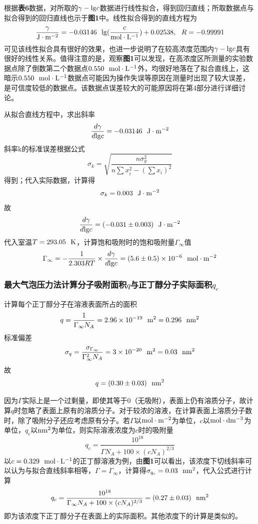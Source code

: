 \documentclass[12pt]{article}
\begin{document}
\par 
根据\textbf{表6}数据，对所取的$\gamma-{\rm lg}c$数据进行线性拟合，得到回归直线；所取数据点与拟合得到的回归直线也示于\textbf{图1}中。线性拟合得到的直线方程为
$$
\frac{\gamma}{{\rm J\cdot m^{-2}}}=-0.03146\ \ {\rm lg}(\frac{c}{{\rm mol\cdot L^{-1}}})+0.02538,\ \ R=-0.99991
$$
可见该线性拟合具有很好的效果，也进一步说明了在较高浓度范围内$\gamma-{\rm lg}c$具有很好的线性关系。值得注意的是，观察\textbf{图1}可以发现，在高浓度区所测量的实验数据点除了倒数第二个数据点$0.550\ \ {\rm mol\cdot L^{-1}}$外，均很好地落在了拟合直线上，这暗示$0.550\ \ {\rm mol\cdot L^{-1}}$数据点可能因为操作失误等原因在测量时出现了较大误差，是可信度较低的数据点。该数据点误差较大的可能原因将在第4部分进行详细讨论。\par 
从拟合直线方程中，求出斜率
$$
\frac{d\gamma}{d{\rm lg}c}=-0.03146\ \ {\rm J\cdot m^{-2}}
$$
斜率k的标准误差根据公式
$$
\sigma_{k}=\sqrt{\frac{n\sigma^{2}_{y}}{n\sum x^{2}_{i}-(\sum x_{i})^{2}}}
$$
得到；代入实际数据，计算得
$$
\sigma_{k}=0.003\ \ {\rm J\cdot m^{-2} }
$$
故
$$
\frac{d\gamma}{d{\rm lg}c}=(-0.031\pm0.003) \ \ {\rm J\cdot m^{-2}}
$$
代入室温$T=293.05\ \ {\rm K}$，计算饱和吸附时的饱和吸附量$\Gamma_{\infty}$值
$$
\Gamma_{\infty}=-\frac{1}{2.303RT}\times\frac{d\gamma}{d{\rm lg}c}=(5.6\pm 0.5)\times10^{-6}\ \ {\rm mol\cdot m^{-2}}
$$
\subsubsection{最大气泡压力法计算分子吸附面积$q$与正丁醇分子实际面积$q_{c}$}
计算每个正丁醇分子在溶液表面所占的面积
$$
q=\frac{1}{\Gamma_{\infty}N_{A}}=2.96\times10^{-19}\ \ {\rm m^2}=0.296\ \ {\rm nm^{2}}
$$
标准偏差
$$
\sigma_{q}=\frac{\sigma_{\Gamma_{\infty}}}{\Gamma^{2}_{\infty} N_{A}}=3\times10^{-20}\ \ {\rm m^{2}}=0.03\ \ {\rm nm^{2}}
$$
故
$$
q=(0.30\pm 0.03)\ \ {\rm nm^{2}}
$$
\par 
因为$\Gamma$实际上是一个过剩量，即使其等于0（无吸附），表面上仍有溶质分子，故计算$q$时忽略了表面上原有的溶质分子。对于较浓的溶液，在计算表面上溶质分子数时，除了吸附分子还应考虑原有分子。若$\Gamma$以$\rm mol\cdot m^{-2}$为单位，$c$以$\rm mol\cdot dm^{-3}$为单位，$q_{c}$以$\rm nm^{2}$为单位，则实际溶液浓度为$c$时的吸附量
$$
q_{c}=\frac{10^{18}}{\Gamma N_{A}+100\times(cN_{A})^{2/3}}
$$
以$c=0.329\ \ {\rm mol\cdot L^{-1}}$的正丁醇溶液为例，由\textbf{图1}可以看出，该浓度下切线斜率可以认为与拟合直线斜率相等，$\Gamma=\Gamma_{\infty}$，计算得$\sigma_{q_{c}}=0.03\ \ {\rm nm^{2}}$，代入公式进行计算
$$
q_{c}=\frac{10^{18}}{\Gamma_{\infty} N_{A}+100\times(cN_{A})^{2/3}}=(0.27\pm 0.03)\ \ {\rm nm^{2}}
$$
即为该浓度下正丁醇分子在表面上的实际面积。其他浓度下的计算是类似的。
\end{document}
